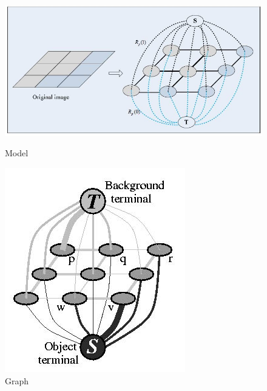 \documentclass[lang=cn,11pt,a4paper]{elegantpaper}
\begin{document}
\begin{figure}[ht]
    \centering
	\begin{minipage}{0.5\linewidth}
		\centering
		\includegraphics[width=0.9 \linewidth]{image/Illustration-of-s-t-graph-The-image-pixels-correspond-to-the-neighbor-nodes-in-the-model.jpg}
		\caption{Model}
	\end{minipage}%
	\begin{minipage}{0.25\linewidth}
		\centering
		\includegraphics[width=0.8 \linewidth]{image/graph_cut_pic1.jpg}
		\caption{Graph}
	\end{minipage}%
	\begin{minipage}{0.25\linewidth}
		\centering

\end{minipage}
\end{figure}
\end{document}
